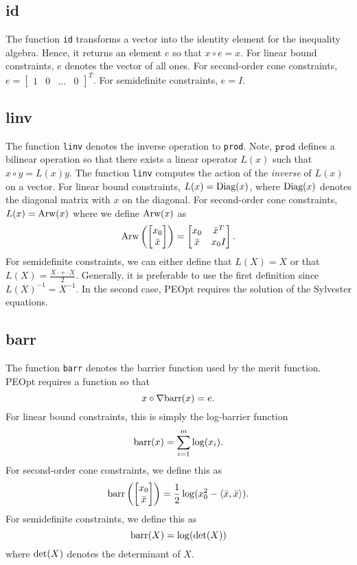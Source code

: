\documentclass{report}
\begin{document}
\subsection{id} 

       The function \texttt{id} transforms a vector into the identity element for the inequality algebra.  Hence, it returns an element $e$ so that $x\circ e=x$.   For linear bound constraints, $e$ denotes the vector of all ones.  For second-order cone constraints, $e=\begin{bmatrix} 1 & 0 & \dots & 0\end{bmatrix}^T$.  For semidefinite constraints, $e=I$.

\subsection{linv}

        The function \texttt{linv} denotes the inverse operation to \texttt{prod}.  Note, $\texttt{prod}$ defines a bilinear operation so that there exists a linear operator $L(x)$ such that $x\circ y=L(x)y$.  The function \texttt{linv} computes the action of the {\it inverse} of $L(x)$ on a vector.  For linear bound constraints, $L(x)=\textnormal{Diag}(x)$, where $\textnormal{Diag}(x)$ denotes the diagonal matrix with $x$ on the diagonal.  For second-order cone constraints, $L(x)=\textnormal{Arw}(x)$ where we define $\textnormal{Arw}(x)$ as
$$
        \textnormal{Arw}\left(\begin{bmatrix}x_0\\\bar{x}\end{bmatrix}\right) =
\begin{bmatrix}
        x_0 & \bar{x}^T\\\bar{x} & x_0 I
\end{bmatrix}.
$$
For semidefinite constraints, we can either define that $L(X)=X$ or that $L(X)=\frac{X\cdot + \cdot X}{2}$.  Generally, it is preferable to use the first definition since $L(X)^{-1}=X^{-1}$.  In the second case, PEOpt requires the solution of the Sylvester equations.

\subsection{barr}

        The function \texttt{barr} denotes the barrier function used by the merit function.  PEOpt requires a function so that
$$
    x\circ \nabla \textnormal{barr}(x) = e.
$$
For linear bound constraints, this is simply the log-barrier function
$$
    \textnormal{barr}(x) = \sum\limits_{i=1}^m \log(x_i).
$$
For second-order cone constraints, we define this as
$$
    \textnormal{barr}\left(\begin{bmatrix}x_0\\\bar{x}\end{bmatrix}\right) = \frac{1}{2} \log(x_0^2-\langle \bar{x},\bar{x}\rangle).
$$
For semidefinite constraints, we define this as
$$
    \textnormal{barr}(X)=\log(\textnormal{det}(X))
$$
where $\textnormal{det}(X)$ denotes the determinant of $X$.
\end{document}
